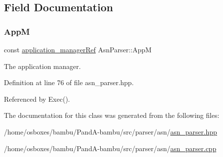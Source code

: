 \subsection{Field Documentation}
\mbox{\label{classAsnParser_a4e0a80b38bb3eca0c3c6641bf6173fff}} 
\subsubsection{\texorpdfstring{AppM}{AppM}}
{\footnotesize\ttfamily const \hyperlink{application__manager_8hpp_a04ccad4e5ee401e8934306672082c180}{application\+\_\+manager\+Ref} Asn\+Parser\+::\+AppM\hspace{0.3cm}{\ttfamily [protected]}}



The application manager. 



Definition at line 76 of file asn\+\_\+parser.\+hpp.



Referenced by Exec().



The documentation for this class was generated from the following files\+:\begin{DoxyCompactItemize}
\item 
/home/osboxes/bambu/\+Pand\+A-\/bambu/src/parser/asn/\hyperlink{asn__parser_8hpp}{asn\+\_\+parser.\+hpp}\item 
/home/osboxes/bambu/\+Pand\+A-\/bambu/src/parser/asn/\hyperlink{asn__parser_8cpp}{asn\+\_\+parser.\+cpp}\end{DoxyCompactItemize}
